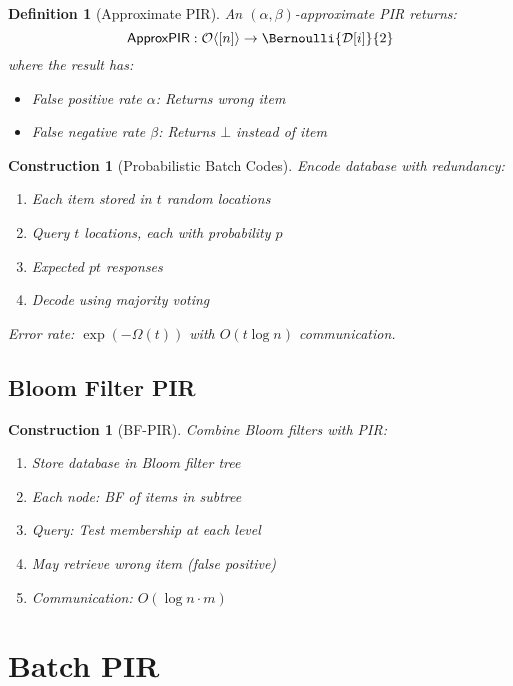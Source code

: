 \documentclass[11pt,final,hidelinks]{article}
\newcommand{\DB}{\mathcal{D}}
\newcommand{\Index}[1]{[#1]}
\newtheorem{definition}[theorem]{Definition}
\newtheorem{construction}[theorem]{Construction}
\begin{document}
\begin{definition}[Approximate PIR]
An $(\alpha, \beta)$-approximate PIR returns:
\begin{equation}
\mathsf{ApproxPIR}: \Obv{\Index{n}} \to \Bernoulli{\DB[i]}{2}
\end{equation}
where the result has:
\begin{itemize}
    \item False positive rate $\alpha$: Returns wrong item
    \item False negative rate $\beta$: Returns $\bot$ instead of item
\end{itemize}
\end{definition}

\begin{construction}[Probabilistic Batch Codes]
Encode database with redundancy:
\begin{enumerate}
    \item Each item stored in $t$ random locations
    \item Query $t$ locations, each with probability $p$
    \item Expected $pt$ responses
    \item Decode using majority voting
\end{enumerate}
Error rate: $\exp(-\Omega(t))$ with $O(t \log n)$ communication.
\end{construction}

\subsection{Bloom Filter PIR}

\begin{construction}[BF-PIR]
Combine Bloom filters with PIR:
\begin{enumerate}
    \item Store database in Bloom filter tree
    \item Each node: BF of items in subtree
    \item Query: Test membership at each level
    \item May retrieve wrong item (false positive)
    \item Communication: $O(\log n \cdot m)$
\end{enumerate}
\end{construction}

\section{Batch PIR}
\end{document}
